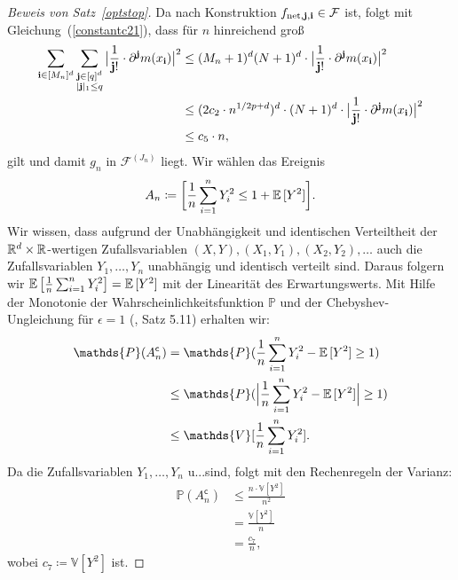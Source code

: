 \begin{proof}[Beweis von Satz~\ref{optstop}]
Da nach Konstruktion $f_{\mathrm{net},\mathbf{j},\mathbf{i}} \in \mathcal{F}$ ist, folgt mit Gleichung~(\ref{constantc21}), dass für $n$ hinreichend groß
\begin{equation*}
\begin{split}
\sum_{\mathbf{i} \in [M_n]^d} \sum_{\substack{ \mathbf{j} \in [q]^d \\ |\mathbf{j}|_1 \leq q}} \big| \frac{1}{\mathbf{j}!} \cdot \partial^{\mathbf{j}}m(x_{\mathbf{i}})\big|^2 & \leq (M_n + 1)^d (N + 1)^d \cdot \big|\frac{1}{\mathbf{j}!} \cdot \partial^{\mathbf{j}}m(x_{\mathbf{i}})\big|^2 \\
& \leq (2 c_2 \cdot n^{1/2p + d})^d \cdot (N + 1)^d \cdot \big|\frac{1}{\mathbf{j}!} \cdot \partial^{\mathbf{j}}m(x_{\mathbf{i}})\big|^2 \\
& \leq c_5 \cdot n,
\end{split}
\end{equation*}
gilt und damit $g_n$ in $\mathcal{F}^{(J_n)}$ liegt. 
Wir wählen das Ereignis 
\begin{equation}
\label{event}
A_n \coloneqq \bigg[\frac{1}{n} \sum_{i = 1}^n Y_i^2 \leq 1 + \mathbb{E}\,[Y^2]\bigg].
\end{equation}
Wir wissen, dass aufgrund der Unabhängigkeit und identischen Verteiltheit der $\mathbb{R}^d \times \mathbb{R}$-wertigen Zufallsvariablen  $(X, Y), (X_1, Y_1), (X_2, Y_2), \dots$ auch die Zufallsvariablen $Y_1,\dots,Y_n$ unabhängig und identisch verteilt sind. 
Daraus folgern wir $\mathbb{E}\,\big[\frac{1}{n} \sum_{i = 1}^n Y_i^2\big] = \mathbb{E}\,[Y^2]$ mit der Linearität des Erwartungswerts.
Mit Hilfe der Monotonie der Wahrscheinlichkeitsfunktion $\mathds{P}$ und der Chebyshev-Ungleichung für $\epsilon = 1$ (\cite{Klenke2013}, Satz 5.11) erhalten wir:
\begin{equation*}
\begin{split}
\mathds{P}(A_n^{\mathsf{c}}) & = \mathds{P}(\frac{1}{n}\sum_{i=1}^n Y_i^2 - \E[Y^2] \geq 1) \\
& \leq \mathds{P}(\Big|\frac{1}{n}\sum_{i=1}^n Y_i^2 - \E[Y^2]\Big| \geq 1) \\
& \leq \mathds{V}[\frac{1}{n}\sum_{i = 1}^nY_i^2].
\end{split}
\end{equation*}
Da die Zufallsvariablen $Y_1,\dots,Y_n$ u.\@i.\@v.\@ sind, folgt mit den Rechenregeln der Varianz:
\begin{equation}
\label{tscheby}
\begin{split}
\mathds{P}(A_n^{\mathsf{c}}) & \leq \frac{n \cdot  \mathds{V}[Y^2]}{n^2} \\
& = \frac{\mathds{V}[Y^2]}{n} \\
& = \frac{c_7}{n},
\end{split}
\end{equation}
wobei $c_7 \coloneqq \mathds{V}[Y^2]$ ist.


\end{proof}
